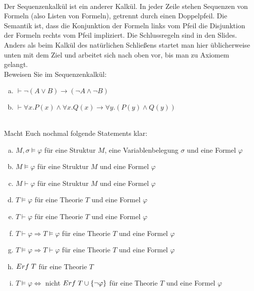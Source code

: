 \\
Der Sequenzenkalkül ist ein anderer Kalkül. In jeder Zeile stehen Sequenzen von Formeln (also Listen von Formeln), getrennt durch einen Doppelpfeil. Die Semantik ist, dass die Konjunktion der Formeln links vom Pfeil die Disjunktion der Formeln rechts vom Pfeil impliziert. Die Schlussregeln sind in den Slides.
Anders als beim Kalkül des natürlichen Schließens startet man hier üblicherweise unten mit dem Ziel und arbeitet sich nach oben vor, bis man zu Axiomem gelangt.\\
Beweisen Sie im Sequenzenkalkül:
\begin{enumerate}[a)]
  \item $\vdash\neg(A\vee B)\to(\neg A\wedge \neg B)$
  \item $\vdash\forall x.P(x)\wedge\forall x.Q(x)\to\forall y.(P(y)\wedge Q(y))$
\end{enumerate}

\\
Macht Euch nochmal folgende Statements klar:
\begin{enumerate}[a)]
  \item $M,\sigma\models\varphi$ für eine Struktur $M$, eine Variablenbelegung $\sigma$ und eine Formel $\varphi$
  \item $M\models\varphi$ für eine Struktur $M$ und eine Formel $\varphi$
  \item $M\vdash\varphi$ für eine Struktur $M$ und eine Formel $\varphi$
  \item $T\models\varphi$ für eine Theorie $T$ und eine Formel $\varphi$
  \item $T\vdash\varphi$ für eine Theorie $T$ und eine Formel $\varphi$
  \item $T\vdash\varphi\Rightarrow T\models\varphi$ für eine Theorie $T$ und eine Formel $\varphi$
  \item $T\models\varphi\Rightarrow T\vdash\varphi$ für eine Theorie $T$ und eine Formel $\varphi$
  \item $Erf\hspace{0.1cm}T$ für eine Theorie $T$
  \item $T\models\varphi\Leftrightarrow$ nicht $Erf\hspace{0.1cm} T\cup\{\neg\varphi\}$ für eine Theorie $T$ und eine Formel $\varphi$
  
\end{enumerate}

